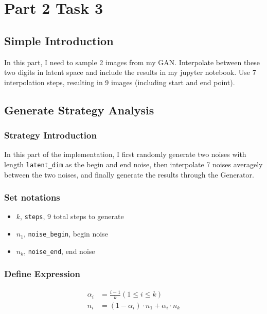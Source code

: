 

\section{Part 2 Task 3}

\subsection{Simple Introduction}

In this part, I need to sample 2 images from my GAN. Interpolate between these two digits in latent space and include the results in my jupyter notebook.
Use 7 interpolation steps, resulting in 9 images (including start and end point).

\subsection{Generate Strategy Analysis}

\subsubsection{Strategy Introduction}

In this part of the implementation, I first randomly generate two noises with length \texttt{latent\_dim} as the begin and end noise,
then interpolate 7 noises averagely between the two noises, and finally generate the results through the Generator.

\subsubsection{Set notations}

\begin{itemize}
  \item $k$, \texttt{steps}, $9$ total steps to generate
  \item $n_1$, \texttt{noise\_begin}, begin noise
  \item $n_k$, \texttt{noise\_end}, end noise
\end{itemize}

\subsubsection{Define Expression}

\begin{align}
  \alpha_i &= \frac{i-1}{k} (1 \leq i \leq k) \\
  n_i &= (1 - \alpha_i) \cdot n_1 +\alpha_i \cdot n_k
\end{align}

